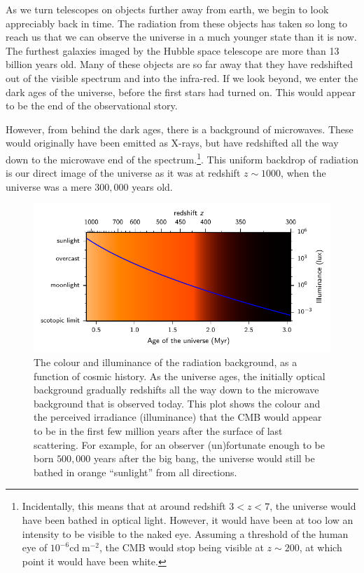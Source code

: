 As we turn telescopes on objects further away from earth, we begin to look appreciably back in time. The radiation from these objects has taken so long to reach us that we can observe the universe in a much younger state than it is now. The furthest galaxies imaged by the Hubble space telescope are more than 13 billion years old. Many of these objects are so far away that they have redshifted out of the visible spectrum and into the infra-red. If we look beyond, we enter the dark ages of the universe, before the first stars had turned on. This would appear to be the end of the observational story.

However, from behind the dark ages, there is a background of microwaves. These would originally have been emitted as X-rays, but have redshifted all the way down to the microwave end of the spectrum.\footnote{Incidentally, this means that at around redshift $3<z<7$, the universe would have been bathed in optical light. However, it would have been at too low an intensity to be visible to the naked eye. Assuming a threshold of the human eye of $10^{-6}\mathrm{cd}\;\mathrm{m}^{-2}$, the CMB would stop being visible at $z\sim200$, at which point it would have been white.}. This uniform backdrop of radiation is our direct image of the universe as it was at redshift $z\sim1000$, when the universe was a mere $300,000$ years old.

\begin{figure}[tp]
  \centering
  \includegraphics[width=\textwidth]{chapters/inflationary_cosmology/figures/cmb_colour}
  \caption{The colour and illuminance of the radiation background, as a function of cosmic history. As the universe ages, the initially optical background gradually redshifts all the way down to the microwave background that is observed today. This plot shows the colour and the perceived irradiance (illuminance) that the CMB would appear to be in the first few million years after the surface of last scattering. For example, for an observer (un)fortunate enough to be born $500,000$ years after the big bang, the universe would still be bathed in orange ``sunlight'' from all directions.}\label{fig:cos:cmb_colour}
\end{figure}


